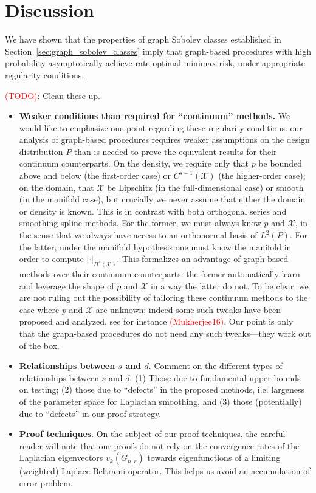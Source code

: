 \documentclass{article}
\newcommand{\1}{\mathbf{1}}
\newcommand{\Xset}{\mathcal{X}}
\newcommand{\Leb}{L}
\theoremstyle{alden}
\theoremstyle{aldenthm}
\theoremstyle{definition}
\theoremstyle{remark}
\begin{document}
\section{Discussion}
\label{sec:discussion}
We have shown that the properties of graph Sobolev classes established in Section~\ref{sec:graph_sobolev_classes} imply that graph-based procedures with high probability asymptotically achieve rate-optimal minimax risk, under appropriate regularity conditions. 

\textcolor{red}{(TODO)}: Clean these up.
\begin{itemize}
	\item \textbf{Weaker conditions than required for ``continuum'' methods.}  We would like to emphasize one point regarding these regularity conditions: our analysis of graph-based procedures requires weaker assumptions on the design distribution $P$ than is needed to prove the equivalent results for their continuum counterparts. On the density, we require only that $p$ be bounded above and below (the first-order case) or $C^{s-1}(\Xset)$ (the higher-order case); on the domain, that $\Xset$ be Lipschitz (in the full-dimensional case) or smooth (in the manifold case), but crucially we never assume that either the domain or density is known. This is in contrast with both orthogonal series and smoothing spline methods. For the former, we must always know $p$ and $\Xset$, in the sense that we always have access to an orthonormal basis of $\Leb^2(P)$. For the latter, under the manifold hypothesis one must know the manifold in order to compute $|\cdot|_{H^s(\Xset)}$. This formalizes an advantage of graph-based methods over their continuum counterparts: the former automatically learn and leverage the shape of $p$ and $\Xset$ in a way the latter do not. To be clear, we are not ruling out the possibility of tailoring these continuum methods to the case where $p$ and $\Xset$ are unknown; indeed some such tweaks have been proposed and analyzed, see for instance \textcolor{red}{(Mukherjee16)}. Our point is only that the graph-based procedures do not need any such tweaks---they work out of the box.
	\item \textbf{Relationships between $s$ and $d$}. Comment on the different types of relationships between $s$ and $d$. (1) Those due to fundamental upper bounds on testing; (2) those due to ``defects'' in the proposed methods, i.e. largeness of the parameter space for Laplacian smoothing, and (3) those (potentially) due to ``defects'' in our proof strategy.
	\item \textbf{Proof techniques}. On the subject of our proof techniques, the careful reader will note that our proofs do not rely on the convergence rates of the Laplacian eigenvectors $v_k(G_{n,r})$ towards eigenfunctions of a limiting (weighted) Laplace-Beltrami operator. This helps us avoid an accumulation of error problem.

\end{itemize}
\end{document}
